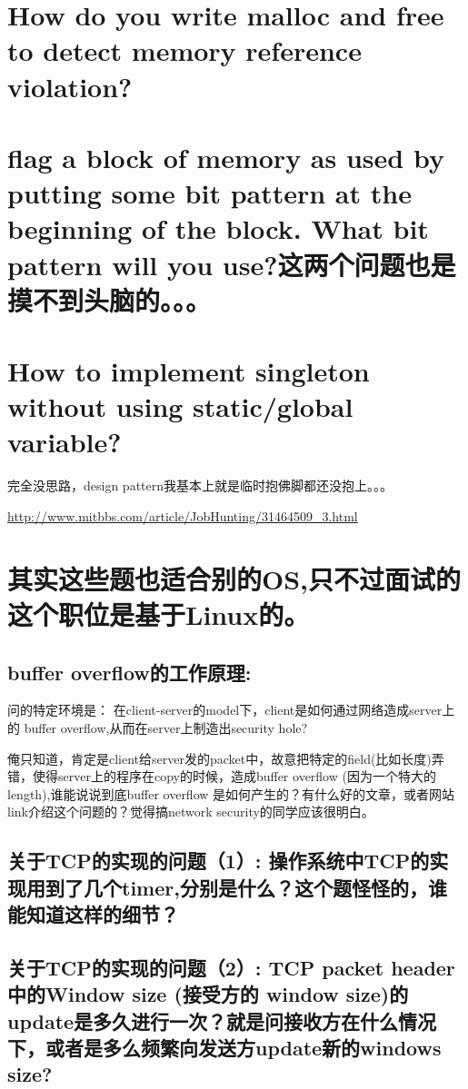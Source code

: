 \documentclass[12pt]{book}
\begin{document}
\section{How do you write malloc and free to detect memory reference violation?}
\label{sec-13-20}

\section{flag a block of memory as used by putting some bit pattern at the beginning of the block. What bit pattern will you use?这两个问题也是摸不到头脑的。。。}
\label{sec-13-21}

\section{How to implement singleton without using static/global variable?}
\label{sec-13-22}

完全没思路，design pattern我基本上就是临时抱佛脚都还没抱上。。。

\url{http://www.mitbbs.com/article/JobHunting/31464509_3.html}

\section{其实这些题也适合别的OS,只不过面试的这个职位是基于Linux的。}
\label{sec-13-23}

\subsection{buffer overflow的工作原理:}
\label{sec-13-23-1}

问的特定环境是： 在client-server的model下，client是如何通过网络造成server上的 buffer overflow,从而在server上制造出security hole?

俺只知道，肯定是client给server发的packet中，故意把特定的field(比如长度)弄错，使得server上的程序在copy的时候，造成buffer overflow (因为一个特大的length),谁能说说到底buffer overflow 是如何产生的？有什么好的文章，或者网站link介绍这个问题的？觉得搞network security的同学应该很明白。

\subsection{关于TCP的实现的问题（1）: 操作系统中TCP的实现用到了几个timer,分别是什么？这个题怪怪的，谁能知道这样的细节？}
\label{sec-13-23-2}

\subsection{关于TCP的实现的问题（2）: TCP packet header 中的Window size (接受方的 window size)的update是多久进行一次？就是问接收方在什么情况下，或者是多么频繁向发送方update新的windows size?}
\label{sec-13-23-3}
\end{document}
